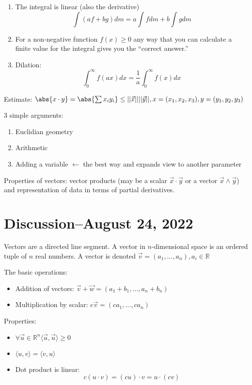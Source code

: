 \documentclass{scrreprt}
\begin{document}
\begin{enumerate}
	\item The integral is linear (also the derivative)
	\[
		\int(af+bg)dm=a\int fdm + b\int gdm
	\]
	\item For a non-negative function $f(x)\geq 0$ any way that you can calculate a
	finite value for the integral gives you the ``correct answer.''
	\item Dilation: \[
		\int_0^\infty f(ax)dx=\frac{1}{a}\int_0^\infty f(x)dx
	\]
\end{enumerate}

\begin{remark}

Estimate: $\abs{x\cdot y}=\abs{\sum x_i y_i}\leq||\vec{x}||||\vec{y}||, x =(x_1,x_2,x_3), y=(y_1,y_2,y_3)$ 

3 simple arguments:
\begin{enumerate}
	\item Euclidian geometry
	\item Arithmetic
	\item Adding a variable $\leftarrow$ the best way and expands view to another parameter
\end{enumerate}
\end{remark}
Properties of vectors:
vector products (may be a scalar $\vec{x}\cdot \vec{y}$ or a vector $\vec{x}\wedge \vec{y}$) and representation of data in terms of partial derivatives.

\section{Discussion--August 24, 2022}

Vectors are a directed line segment. A vector in $n$-dimensional space is an
ordered tuple of $n$ real numbers. A vector is denoted $\vec{v}=(a_1,\ldots, a_n), a_i \in \mathbb{R}$

The basic operations:

\begin{itemize}
	\item Addition of vectors: $\vec{v}+\vec{w}=(a_1+b_1,\ldots, a_n+b_n)$
	\item Multiplication by scalar: $c\vec{v}=(ca_1,\ldots, ca_n)$
\end{itemize}

Properties:

\begin{itemize}
	\item $\forall \vec{u}\in \mathbb{R}^n \langle \vec{u}, \vec{u}\rangle \geq 0$
	\item $\langle u, v \rangle = \langle v, u \rangle$
	\item Dot product is linear: \[
		c(u\cdot v) = (cu)\cdot v = u\cdot (cv)
	\]
\end{itemize}
\end{document}
